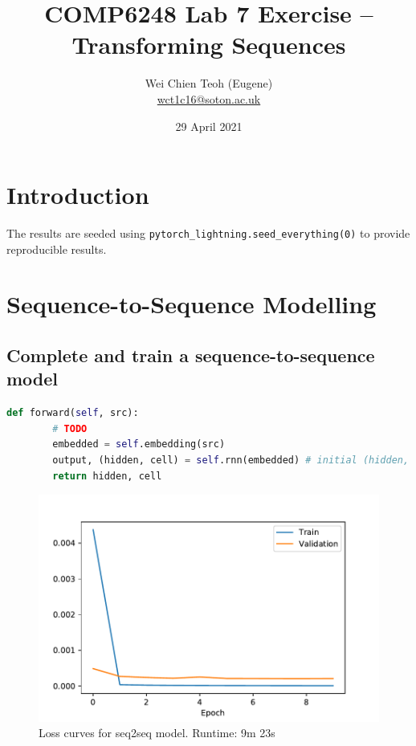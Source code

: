\documentclass[twocolumn]{article}
\title{\Large COMP6248 Lab 7 Exercise -- Transforming Sequences}
\author{\small Wei Chien Teoh (Eugene)\\\bigskip \href{mailto:wct1c16@soton.ac.uk}{wct1c16@soton.ac.uk}}
\date{\small 29 April 2021}
\begin{document}
\maketitle

\section*{Introduction}

The results are seeded using \lstinline{pytorch_lightning.seed_everything(0)} to provide reproducible results.

\section{Sequence-to-Sequence Modelling}

\subsection{Complete and train a sequence-to-sequence model}

\begin{lstlisting}[caption={Encoder class forward method.},language=Python]
    def forward(self, src):
        # TODO
        embedded = self.embedding(src)
        output, (hidden, cell) = self.rnn(embedded) # initial (hidden, cell) defaults to zero
        return hidden, cell
\end{lstlisting}

\begin{figure}
    \centering
    \includegraphics[width=\linewidth]{Figures/learning-curve.pdf}
    \caption{Loss curves for seq2seq model. Runtime: 9m 23s}
\end{figure}
\end{document}
